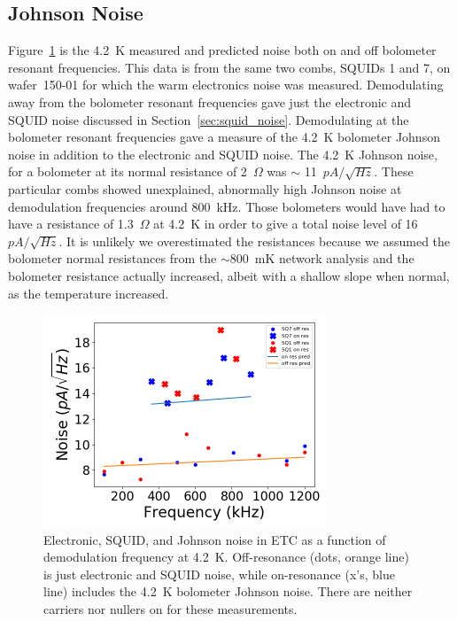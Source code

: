 \subsection{Johnson Noise}
\label{sec:johnson_noise}


Figure~\ref{fig:johnson_and_squid_noise} is the 4.2~K measured and predicted noise both on and off bolometer resonant frequencies. 
This data is from the same two combs, \ac{SQUID}s 1 and 7, on wafer~150-01 for which the warm electronics noise was measured. 
Demodulating away from the bolometer resonant frequencies gave just the electronic and \ac{SQUID} noise discussed in Section~\ref{sec:squid_noise}.
Demodulating at the bolometer resonant frequencies gave a measure of the 4.2~K bolometer Johnson noise in addition to the electronic and \ac{SQUID} noise. 
The 4.2~K Johnson noise, for a bolometer at its normal resistance of 2~$\Omega$ was $\sim$ 11~$pA/\sqrt{Hz}$.
These particular combs showed unexplained, abnormally high Johnson noise at demodulation frequencies around 800~kHz. 
Those bolometers would have had to have a resistance of 1.3~$\Omega$ at 4.2~K in order to give a total noise level of 16~$pA/\sqrt{Hz}$. 
It is unlikely we overestimated the resistances because we assumed the bolometer normal resistances from the $\sim$800~mK network analysis and the bolometer resistance actually increased, albeit with a shallow slope when normal, as the temperature increased. 

\begin{figure}[htp]
\begin{center}
\includegraphics[height=2.5in]{figures/squid_plus_electronic_noise.png}
\caption{Electronic, \ac{SQUID}, and Johnson noise in \ac{ETC} as a function of demodulation frequency at 4.2~K. Off-resonance (dots, orange line) is just electronic and \ac{SQUID} noise, while on-resonance (x's, blue line) includes the 4.2~K bolometer Johnson noise. There are neither carriers nor nullers on for these measurements. 
\label{fig:johnson_and_squid_noise} }
\end{center}
\end{figure}

